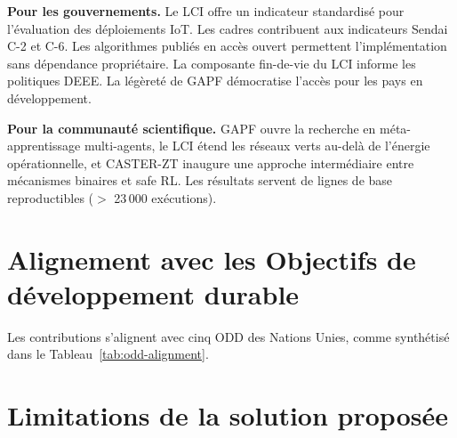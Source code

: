 \textbf{Pour les gouvernements.}
Le LCI offre un indicateur standardisé pour l'évaluation des déploiements IoT. Les cadres contribuent aux indicateurs Sendai C-2 et C-6. Les algorithmes publiés en accès ouvert permettent l'implémentation sans dépendance propriétaire. La composante fin-de-vie du LCI informe les politiques DEEE. La légèreté de GAPF démocratise l'accès pour les pays en développement.

\textbf{Pour la communauté scientifique.}
GAPF ouvre la recherche en méta-apprentissage multi-agents, le LCI étend les réseaux verts au-delà de l'énergie opérationnelle, et CASTER-ZT inaugure une approche intermédiaire entre mécanismes binaires et safe RL. Les résultats servent de lignes de base reproductibles ($>$ 23\,000 exécutions).


\section{Alignement avec les Objectifs de développement durable}\label{sec:concl-odd}

Les contributions s'alignent avec cinq ODD des Nations Unies, comme synthétisé dans le Tableau~\ref{tab:odd-alignment}.

\begin{table}[htbp]
\centering
\caption{Alignement des contributions avec les ODD des Nations Unies.}
\label{tab:odd-alignment}
\end{table}


\section{Limitations de la solution proposée}\label{sec:concl-limitations}

